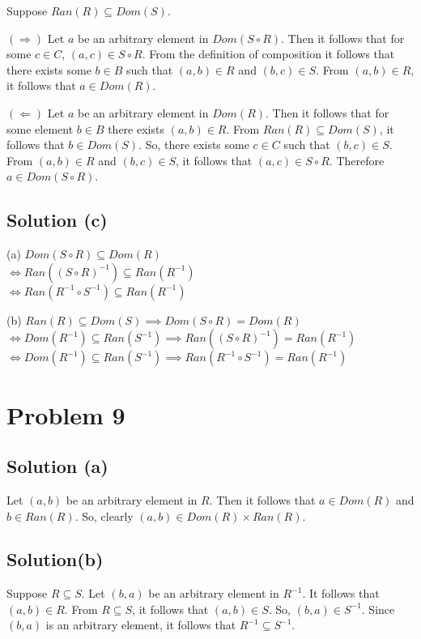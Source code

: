\documentclass{article}
\begin{document}
Suppose $Ran (R) \subseteq Dom(S)$. 

$(\Rightarrow)$ Let $a$ be an arbitrary element in $Dom(S \circ R)$.
Then it follows that for some $c \in C$, $(a,c) \in S \circ R$. From
the definition of composition it follows that there exists some $b \in
B$ such that $(a,b) \in R$ and $(b,c) \in S$. From $(a,b) \in R$, it
follows that $a \in Dom(R)$.

$(\Leftarrow)$ Let $a$ be an arbitrary element in $Dom(R)$. Then it
follows that for some element $b \in B$ there exists $(a,b) \in R$.
From $Ran(R) \subseteq Dom(S)$, it follows that $b \in Dom(S)$. So,
there exists some $c \in C$ such that $(b,c) \in S$. From $(a,b) \in
R$ and $(b,c) \in S$, it follows that $(a,c) \in S \circ R$. Therefore
$a \in Dom(S \circ R)$.

\subsection{Solution (c)}

(a) $Dom(S \circ R) \subseteq Dom(R)$ \\
$ \iff Ran((S \circ R)^{-1}) \subseteq Ran(R^{-1})$ \\
$ \iff Ran(R^{-1} \circ S^{-1}) \subseteq Ran(R^{-1})$

(b) $Ran(R) \subseteq Dom(S) \implies Dom(S \circ R) = Dom(R)$ \\
$ \iff Dom(R^{-1}) \subseteq Ran(S^{-1}) \implies Ran((S \circ
R)^{-1}) = Ran(R^{-1})$ \\
$ \iff Dom(R^{-1}) \subseteq Ran(S^{-1}) \implies Ran(R^{-1} \circ
S^{-1}) = Ran(R^{-1})$

\section{Problem 9}

\subsection{Solution (a)}

Let $(a,b)$ be an arbitrary element in $R$. Then it follows that $a
\in Dom(R)$ and $b \in Ran(R)$. So, clearly $(a,b) \in Dom(R) \times Ran(R)$.

\subsection{Solution(b)}

Suppose $R \subseteq S$. Let $(b,a)$ be an arbitrary element in
$R^{-1}$. It follows that $(a,b) \in R$. From $R \subseteq S$, it
follows that $(a,b) \in S$. So, $(b,a) \in S^{-1}$. Since $(b,a)$ is
an arbitrary element, it follows that $R^{-1} \subseteq S^{-1}$.
\end{document}
